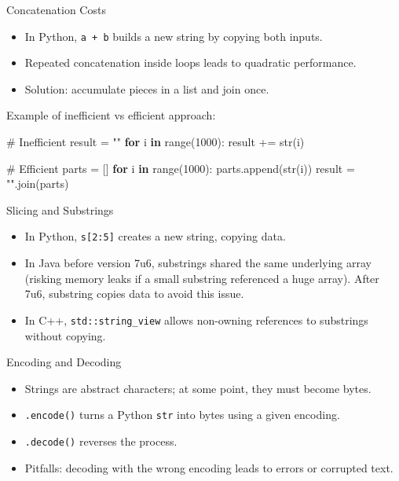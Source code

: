 \documentclass[
  letterpaper,
  DIV=11,
  numbers=noendperiod]{scrreprt}
\newenvironment{Shaded}{\begin{snugshade}}{\end{snugshade}}
\newcommand{\BuiltInTok}[1]{\textcolor[rgb]{0.00,0.23,0.31}{#1}}
\newcommand{\CommentTok}[1]{\textcolor[rgb]{0.37,0.37,0.37}{#1}}
\newcommand{\ControlFlowTok}[1]{\textcolor[rgb]{0.00,0.23,0.31}{\textbf{#1}}}
\newcommand{\DecValTok}[1]{\textcolor[rgb]{0.68,0.00,0.00}{#1}}
\newcommand{\KeywordTok}[1]{\textcolor[rgb]{0.00,0.23,0.31}{\textbf{#1}}}
\newcommand{\NormalTok}[1]{\textcolor[rgb]{0.00,0.23,0.31}{#1}}
\newcommand{\OperatorTok}[1]{\textcolor[rgb]{0.37,0.37,0.37}{#1}}
\newcommand{\StringTok}[1]{\textcolor[rgb]{0.13,0.47,0.30}{#1}}
\providecommand{\tightlist}{%
  \setlength{\itemsep}{0pt}\setlength{\parskip}{0pt}}
\begin{document}
Concatenation Costs

\begin{itemize}
\tightlist
\item
  In Python, \texttt{a\ +\ b} builds a new string by copying both
  inputs.
\item
  Repeated concatenation inside loops leads to quadratic performance.
\item
  Solution: accumulate pieces in a list and join once.
\end{itemize}

Example of inefficient vs efficient approach:

\begin{Shaded}
\begin{Highlighting}[]
\CommentTok{\# Inefficient}
\NormalTok{result }\OperatorTok{=} \StringTok{""}
\ControlFlowTok{for}\NormalTok{ i }\KeywordTok{in} \BuiltInTok{range}\NormalTok{(}\DecValTok{1000}\NormalTok{):}
\NormalTok{    result }\OperatorTok{+=} \BuiltInTok{str}\NormalTok{(i)}

\CommentTok{\# Efficient}
\NormalTok{parts }\OperatorTok{=}\NormalTok{ []}
\ControlFlowTok{for}\NormalTok{ i }\KeywordTok{in} \BuiltInTok{range}\NormalTok{(}\DecValTok{1000}\NormalTok{):}
\NormalTok{    parts.append(}\BuiltInTok{str}\NormalTok{(i))}
\NormalTok{result }\OperatorTok{=} \StringTok{""}\NormalTok{.join(parts)}
\end{Highlighting}
\end{Shaded}

Slicing and Substrings

\begin{itemize}
\tightlist
\item
  In Python, \texttt{s{[}2:5{]}} creates a new string, copying data.
\item
  In Java before version 7u6, substrings shared the same underlying
  array (risking memory leaks if a small substring referenced a huge
  array). After 7u6, substring copies data to avoid this issue.
\item
  In C++, \texttt{std::string\_view} allows non-owning references to
  substrings without copying.
\end{itemize}

Encoding and Decoding

\begin{itemize}
\tightlist
\item
  Strings are abstract characters; at some point, they must become
  bytes.
\item
  \texttt{.encode()} turns a Python \texttt{str} into bytes using a
  given encoding.
\item
  \texttt{.decode()} reverses the process.
\item
  Pitfalls: decoding with the wrong encoding leads to errors or
  corrupted text.
\end{itemize}
\end{document}
